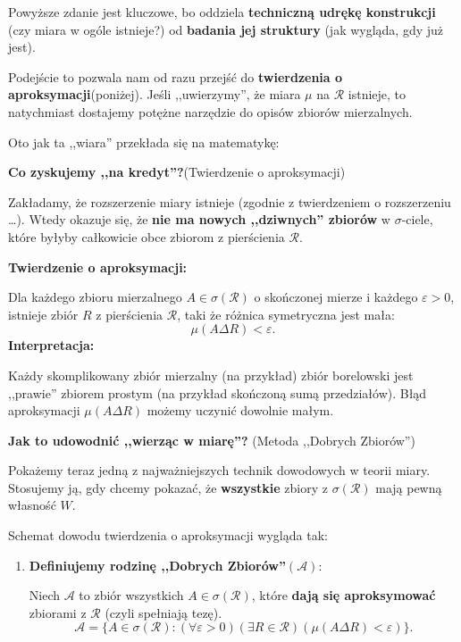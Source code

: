\begin{remark}[Wiara.]
Powyższe zdanie jest kluczowe, bo oddziela \textbf{techniczną udrękę konstrukcji} (czy miara w ogóle istnieje?) od \textbf{badania jej struktury} (jak wygląda, gdy już jest).

Podejście to pozwala nam od razu przejść do \textbf{twierdzenia o aproksymacji}(poniżej). Jeśli ,,uwierzymy'', że miara $\mu$ na $\mathcal{R}$ istnieje, to natychmiast dostajemy potężne narzędzie do opisów zbiorów mierzalnych.

Oto jak ta ,,wiara'' przekłada się na matematykę:

\noindent \textbf{Co zyskujemy ,,na kredyt''?}(Twierdzenie o aproksymacji)

Zakładamy, że rozszerzenie miary istnieje (zgodnie z twierdzeniem o rozszerzeniu \ldots). Wtedy okazuje się, że \textbf{nie ma nowych ,,dziwnych'' zbiorów} w $\sigma $-ciele, które byłyby całkowicie obce zbiorom z pierścienia $\mathcal{R}$.

\noindent \textbf{Twierdzenie o aproksymacji:}

Dla każdego zbioru mierzalnego $A\in \sigma\left( \mathcal{R} \right)  $ o skończonej mierze i każdego $\varepsilon > 0 $, istnieje zbiór $R$ z pierścienia $\mathcal{R}$, taki że różnica symetryczna jest mała:
\[
\mu\left( A \Delta R \right) < \varepsilon 
.\] 
\noindent \textbf{Interpretacja:} 

Każdy skomplikowany zbiór mierzalny (na przykład) zbiór borelowski jest ,,prawie'' zbiorem prostym (na przykład skończoną sumą przedziałów). Błąd aproksymacji $\mu\left( A \Delta R \right) $ możemy uczynić dowolnie małym.

\noindent \textbf{Jak to udowodnić ,,wierząc w miarę''?} (Metoda ,,Dobrych Zbiorów'')

Pokażemy teraz jedną z najważniejszych technik dowodowych w teorii miary. Stosujemy ją, gdy chcemy pokazać, że \textbf{wszystkie} zbiory z $\sigma\left( \mathcal{R} \right) $ mają pewną własność $W$.

\noindent Schemat dowodu twierdzenia o aproksymacji wygląda tak:
\begin{enumerate}[label=\arabic*)]
	\item \textbf{Definiujemy rodzinę ,,Dobrych Zbiorów''}$\bm{ \left( \mathcal{A} \right)  } :$ 

		Niech $\mathcal{A}$ to zbiór wszystkich $A\in \sigma \left( \mathcal{R} \right) $, które \textbf{dają się aproksymować} zbiorami z $\mathcal{R}$ (czyli spełniają tezę).
		\[
		\mathcal{A} = \{A\in \sigma\left( \mathcal{R} \right): \left(\forall \varepsilon > 0 \right)\left(\exists R \in \mathcal{R} \right)\left( \mu\left( A \Delta R \right) < \varepsilon  \right)    \}  
		.\] 


\end{enumerate}
\end{remark}
